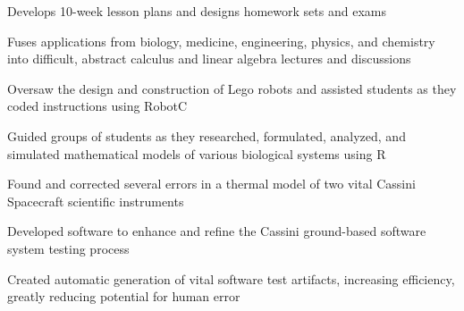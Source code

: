 \documentclass[letterpaper]{deedy-resume} %
\begin{document}
\begin{minipage}[t]{0.66\textwidth}
{\color{black}\begin{tightitemize}
    \item Develops 10-week lesson plans and designs homework sets and exams
    \item Fuses applications from biology, medicine, engineering, physics, and chemistry into difficult, abstract calculus and linear algebra lectures and discussions
    \item Oversaw the design and construction of Lego robots and assisted students as they coded instructions using RobotC
    \item Guided groups of students as they researched, formulated, analyzed, and simulated mathematical models of various biological systems using R
\end{tightitemize}}


\vspace{5pt}

\begin{tightitemize}
\item Found and corrected several errors in a thermal model of two vital Cassini Spacecraft scientific instruments
\item Developed software to enhance and refine the Cassini ground-based software system testing process
\item Created automatic generation of vital software test artifacts, increasing efficiency, greatly reducing potential for human error
\end{tightitemize}


\end{minipage}
\end{document}
